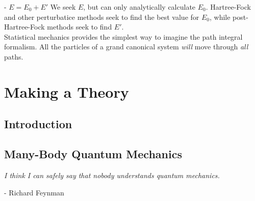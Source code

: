 \documentclass[10pt]{report}
\begin{document}
	- $E = E_0 + E'$ We seek $E$, but can only analytically calculate $E_0$. Hartree-Fock and other perturbatice methods seek to find the best value for $E_0$, while post-Hartree-Fock methods seek to find $E'$.\\
	
	Statistical mechanics provides the simplest way to imagine the path integral formalism. All the particles of a grand canonical system \emph{will} move through \emph{all} paths.
	
	\begin{abstract}
		
	\end{abstract}
	
		\tableofcontents
		\newpage
	
	\part{Making a Theory}
	
	\chapter{Introduction}
	
	\chapter{Many-Body Quantum Mechanics}
	\epigraph{\textit{I think I can safely say that nobody understands quantum mechanics.}}{- Richard Feynman}
	
\end{document}
